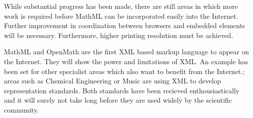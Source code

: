 While substantial progress has been made, there are still areas in which more work is required before MathML can be
incorporated easily into the Internet. Further improvement in coordination between browsers and embedded elements will be
necessary. Furthermore, higher printing resolution must be achieved.

MathML and OpenMath are the first XML based markup language to appear on the Internet. They will show the power and limitations of XML.
An example has been set for other specialist areas which also want to benefit from the Internet.; areas such as Chemical Engineering or Music are
using XML to develop representation standards. Both standards have been recieved enthousiastically and it will surely not take long before they are
used widely by the scientific community.


